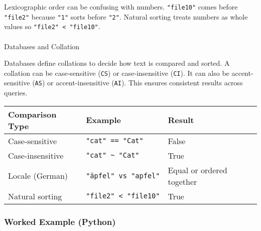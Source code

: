\documentclass[
  letterpaper,
  DIV=11,
  numbers=noendperiod]{scrreprt}
\makeatletter
\let\oldparagraph\paragraph
\renewcommand{\paragraph}{
    \@ifstar
      \xxxParagraphStar
      \xxxParagraphNoStar
  }
\newcommand{\xxxParagraphStar}[1]{\oldparagraph*{#1}\mbox{}}
\newcommand{\xxxParagraphNoStar}[1]{\oldparagraph{#1}\mbox{}}
\makeatother
\begin{document}
Lexicographic order can be confusing with numbers. \texttt{"file10"}
comes before \texttt{"file2"} because \texttt{"1"} sorts before
\texttt{"2"}. Natural sorting treats numbers as whole values so
\texttt{"file2"\ \textless{}\ "file10"}.

\paragraph{Databases and Collation}\label{databases-and-collation}

Databases define collations to decide how text is compared and sorted. A
collation can be case-sensitive (\texttt{CS}) or case-insensitive
(\texttt{CI}). It can also be accent-sensitive (\texttt{AS}) or
accent-insensitive (\texttt{AI}). This ensures consistent results across
queries.

\begin{longtable}[]{@{}lll@{}}
\toprule\noalign{}
Comparison Type & Example & Result \\
\midrule\noalign{}
\endhead
\bottomrule\noalign{}
\endlastfoot
Case-sensitive & \texttt{"cat"\ ==\ "Cat"} & False \\
Case-insensitive & \texttt{"cat"\ \textasciitilde{}\ "Cat"} & True \\
Locale (German) & \texttt{"äpfel"\ vs\ "apfel"} & Equal or ordered
together \\
Natural sorting & \texttt{"file2"\ \textless{}\ "file10"} & True \\
\end{longtable}

\subsubsection{Worked Example (Python)}\label{worked-example-python-11}
\end{document}
